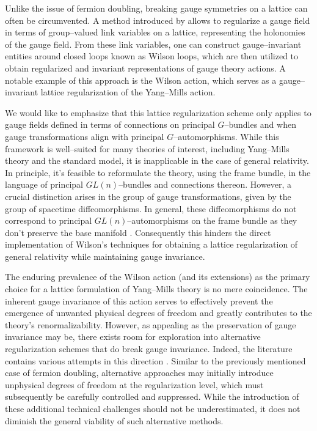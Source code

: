 Unlike the issue of fermion doubling, breaking gauge symmetries on a lattice can often be circumvented. 
A method introduced by \textcite{Wilson:1974sk} allows to regularize a gauge field in terms of group--valued link variables on a lattice, representing the holonomies of the gauge field. 
From these link variables, one can construct gauge--invariant entities around closed loops known as Wilson loops, which are then utilized to obtain regularized and invariant representations of gauge theory actions.
A notable example of this approach is the Wilson action, which serves as a gauge--invariant lattice regularization of the Yang--Mills action. 

We would like to emphasize that this lattice regularization scheme only applies to gauge fields defined in terms of connections on principal $G$--bundles and when gauge transformations align with principal $G$--automorphisms. 
While this framework is well--suited for many theories of interest, including Yang--Mills theory and the standard model, it is inapplicable in the case of general relativity.
In principle, it's feasible to reformulate the theory, using the frame bundle, in the language of principal $GL(n)$--bundles and connections thereon. 
However, a crucial distinction arises in the group of gauge transformations, given by the group of spacetime diffeomorphisms. 
In general, these diffeomorphisms do not correspond to principal $GL(n)$--automorphisms on the frame bundle as they don't preserve the base manifold \parencite{Isham:1999rh}.
Consequently this hinders the direct implementation of Wilson's techniques for obtaining a lattice regularization of general relativity while maintaining gauge invariance.

The enduring prevalence of the Wilson action (and its extensions) as the primary choice for a lattice formulation of Yang--Mills theory is no mere coincidence. 
The inherent gauge invariance of this action serves to effectively prevent the emergence of unwanted physical degrees of freedom and greatly contributes to the theory's renormalizability. 
However, as appealing as the preservation of gauge invariance may be, there exists room for exploration into alternative regularization schemes that do break gauge invariance. 
Indeed, the literature contains various attempts in this direction \parencite[see, for instance,][]{Rivasseau-YM4}. 
Similar to the previously mentioned case of fermion doubling, alternative approaches may initially introduce unphysical degrees of freedom at the regularization level, which must subsequently be carefully controlled and suppressed. 
While the introduction of these additional technical challenges should not be underestimated, it does not diminish the general viability of such alternative methods. 

